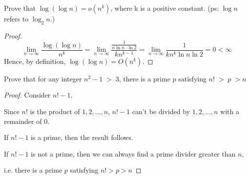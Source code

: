 
\begin{exercise}[]{Prove that $\log (\log n) = o(n^k)$, where k is a positive constant. (ps: $\log n$ refers to $\log_2 n$.)}
  \begin{proof}
  \begin{equation}
    \lim _{n\rightarrow\infty} \frac{\log(\log n)}{n^k} = \lim _{n\rightarrow\infty} \frac{\frac{1}{n\ln n \cdot \ln 2}}{k n^{k-1}} = \lim _{n\rightarrow\infty} \frac{1}{kn^k \ln n \ln 2} = 0 < \infty
  \end{equation}
  Hence, by definition, $\log (\log n) = O(n^k)$.
  \end{proof}
  \label{ex1}
\end{exercise}

\begin{exercise}[]{Prove that for any integer $n^2 -1\;>\;3$, there is a prime $p$ satisfying $n!\;>\;p\;> n$}
  \begin{proof}
    Consider $n!-1$.
    
    Since $n!$ is the product of $1,2,\ldots,n$, $n!-1$ can't be divided by $1,2,\ldots,n$ with a remainder of 0.

    If $n!-1$ is a prime, then the result follows.
    
    If $n!-1$ is not a prime, then we can always find a prime divider greater than $n$,
    
    i.e. there is a prime $p$ satisfying $n! > p > n$
  \end{proof}
  \label{ex2}
\end{exercise}


